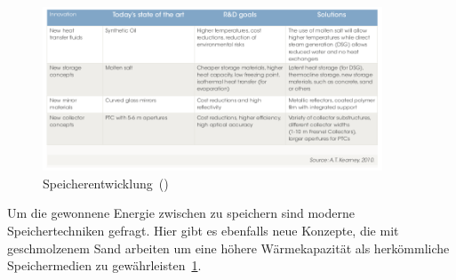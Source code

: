 \begin{figure}[H]
	\centering
	\includegraphics[width=0.9\textwidth,trim=1 1 1 1,clip]{technische_entwicklung2.png}
	\caption{Speicherentwicklung~(\cite{irena2012})}
	\label{fig:technik_e2}
\end{figure}

Um die gewonnene Energie zwischen zu speichern sind moderne Speichertechniken gefragt. Hier gibt es ebenfalls neue Konzepte, die mit geschmolzenem Sand arbeiten um eine höhere Wärmekapazität als herkömmliche Speichermedien zu gewährleisten~\ref{fig:technik_e2}.


